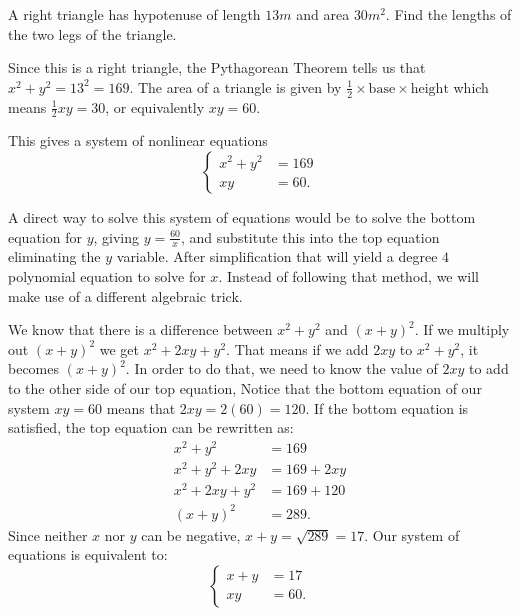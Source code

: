 \documentclass[nooutcomes]{ximera}
\begin{document}
	\begin{exercise}
		A right triangle has hypotenuse of length $13 m$ and area $30 m^2$. Find the lengths of the two legs of the triangle.
		\begin{image}[2in]
		\end{image}
		\begin{explanation}
			
			Since this is a right triangle, the Pythagorean Theorem tells us that $x^2 + y^2 = 13^2 = 169$.
			The area of a triangle is given by $\frac{1}{2}\times \text{base} \times \text{height}$ which means
			$\frac{1}{2}xy = 30$, or equivalently $xy = 60$.

			This gives a system of nonlinear equations
			$$	\begin{cases}
				x^2+y^2 &= 169\\
				xy &= 60.
			\end{cases}	$$
			
			A direct way to solve this system of equations would be to solve the bottom equation for $y$, giving $y = \frac{60}{x}$, and substitute this into the top equation
			eliminating the $y$ variable. After simplification that will yield a degree $4$ polynomial equation to solve for $x$. Instead of following that method, we will make 
			use of a different algebraic trick.
			
			We know that there is a difference between $x^2 + y^2$ and $(x+y)^2$. If we multiply out $(x+y)^2$ we get $x^2 + 2xy + y^2$. That means if we add $2xy$
			to $x^2 + y^2$, it becomes $(x+y)^2$. In order to do that, we need to know the value of $2xy$ to add to the other side of our top equation,
			Notice that the bottom equation of our system $xy=60$ means that $2xy = 2(60)=120$. If the bottom equation is satisfied, the top equation can be
			rewritten as:
			\begin{align*}
				x^2 + y^2 &= 169\\
				x^2 + y^2 + 2xy &= 169 + 2xy\\
				x^2 + 2xy + y^2 &= 169 + 120\\				
				\left( x + y \right)^2 &= 289.
			\end{align*}
			Since neither $x$ nor $y$ can be negative, $x+y = \sqrt{289} = 17$.
			Our system of equations is equivalent to:
			$$	\begin{cases}
				x + y &= 17\\
				xy &= 60.
			\end{cases}	$$
			

\end{explanation}
\end{exercise}
\end{document}
